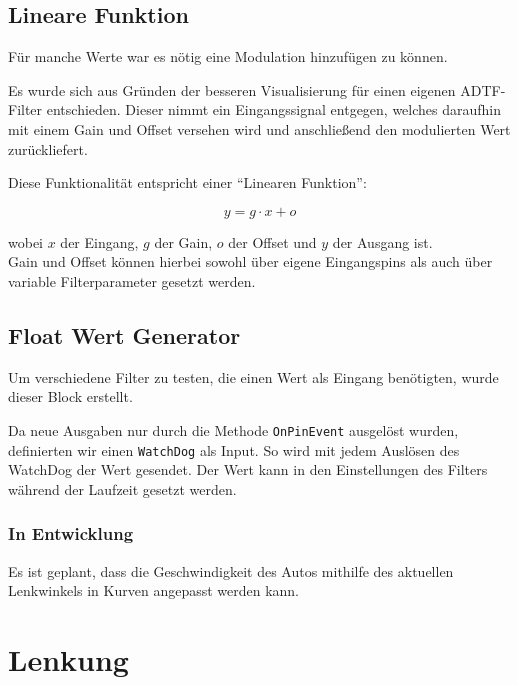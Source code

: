 \documentclass[a4paper,12pt]{report}
\begin{document}
\section{Lineare Funktion}


	Für manche Werte war es nötig eine Modulation hinzufügen zu können.

	Es wurde sich aus Gründen der besseren Visualisierung für einen eigenen ADTF-Filter entschieden.
	Dieser nimmt ein Eingangssignal entgegen, welches daraufhin mit einem Gain und Offset versehen wird und anschließend den modulierten Wert zurückliefert.

	Diese Funktionalität entspricht einer ``Linearen Funktion'':

	\[y = g \cdot x + o\]

	wobei $x$ der Eingang, $g$ der Gain, $o$ der Offset und $y$ der Ausgang ist.
	\\
	Gain und Offset können hierbei sowohl über eigene Eingangspins als auch über variable Filterparameter gesetzt werden.


\section{Float Wert Generator}

	Um verschiedene Filter zu testen, die einen Wert als Eingang benötigten, wurde dieser Block erstellt.

	Da neue Ausgaben nur durch die Methode \texttt{OnPinEvent} ausgelöst wurden, definierten wir einen \texttt{WatchDog} als Input. So wird mit jedem Auslösen des WatchDog der Wert gesendet. Der Wert kann in den Einstellungen des Filters während der Laufzeit gesetzt werden.


\subsection{In Entwicklung}

	Es ist geplant, dass die Geschwindigkeit des Autos mithilfe des aktuellen Lenkwinkels in Kurven angepasst werden kann.

\chapter{Lenkung}
\end{document}
